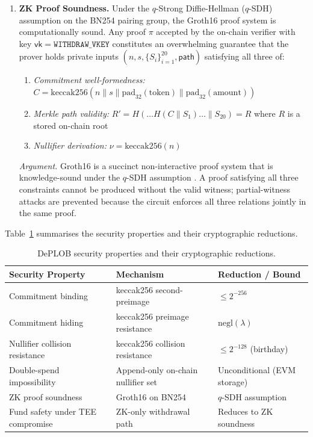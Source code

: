 \documentclass[12pt,a4paper]{article}
\begin{document}
\begin{enumerate}
\item \textbf{ZK Proof Soundness.} Under the $q$-Strong Diffie-Hellman ($q$-SDH) assumption on the BN254 pairing group, the Groth16 proof system is computationally sound. Any proof $\pi$ accepted by the on-chain verifier with key $\mathsf{vk} = \texttt{WITHDRAW\_VKEY}$ constitutes an overwhelming guarantee that the prover holds private inputs $(n, s, \{S_i\}_{i=1}^{20}, \mathsf{path})$ satisfying all three of:
\begin{enumerate}
    \item \textit{Commitment well-formedness:} $C = \mathrm{keccak256}(n \| s \| \mathrm{pad}_{32}(\mathrm{token}) \| \mathrm{pad}_{32}(\mathrm{amount}))$
    \item \textit{Merkle path validity:} $R' = H(\ldots H(C \| S_1) \ldots \| S_{20}) = R$ where $R$ is a stored on-chain root
    \item \textit{Nullifier derivation:} $\nu = \mathrm{keccak256}(n)$
\end{enumerate}
\textit{Argument.} Groth16 is a succinct non-interactive proof system that is knowledge-sound under the $q$-SDH assumption \parencite{groth2016size}. A proof satisfying all three constraints cannot be produced without the valid witness; partial-witness attacks are prevented because the circuit enforces all three relations jointly in the same proof.

\end{enumerate}

Table~\ref{tab:security_summary} summarises the security properties and their cryptographic reductions.

\begin{table}[H]
\centering
\small
\begin{tabular}{|l|l|l|}
\hline
\textbf{Security Property} & \textbf{Mechanism} & \textbf{Reduction / Bound} \\
\hline
Commitment binding & keccak256 second-preimage & $\leq 2^{-256}$ \\
\hline
Commitment hiding & keccak256 preimage resistance & $\mathrm{negl}(\lambda)$ \\
\hline
Nullifier collision resistance & keccak256 collision resistance & $\leq 2^{-128}$ (birthday) \\
\hline
Double-spend impossibility & Append-only on-chain nullifier set & Unconditional (EVM storage) \\
\hline
ZK proof soundness & Groth16 on BN254 & $q$-SDH assumption \\
\hline
Fund safety under TEE compromise & ZK-only withdrawal path & Reduces to ZK soundness \\
\hline
\end{tabular}
\caption{DePLOB security properties and their cryptographic reductions.}
\label{tab:security_summary}
\end{table}
\end{document}
